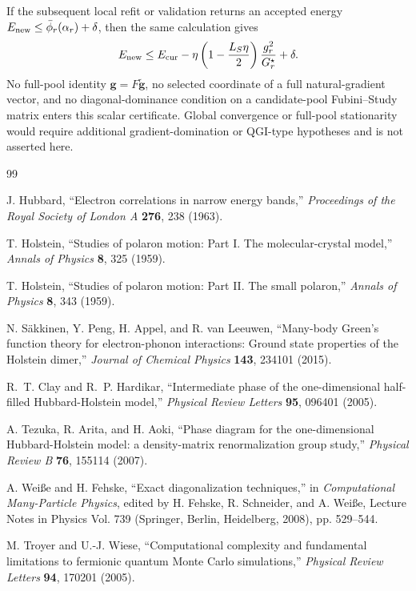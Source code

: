 \documentclass[
  reprint,
  amsmath,
  amssymb,
  aps,
  pra,
  nofootinbib,
  superscriptaddress,
  floatfix
]{revtex4-2}
\begin{document}
If the subsequent local refit or validation returns an accepted energy
\(E_{\rm new}\le\bar\phi_r(\alpha_r)+\delta\), then the same calculation
gives
\[
E_{\rm new}
\le
E_{\rm cur}
-
\eta\left(1-\frac{L_S\eta}{2}\right)
\frac{g_r^2}{G_r^\star}
+
\delta .
\]
No full-pool identity \(\mathbf g=F\tilde{\mathbf g}\), no selected
coordinate of a full natural-gradient vector, and no diagonal-dominance
condition on a candidate-pool Fubini--Study matrix enters this scalar
certificate. Global convergence or full-pool stationarity would require
additional gradient-domination or QGI-type hypotheses and is not asserted
here.

\begin{thebibliography}{99}

J. Hubbard,
``Electron correlations in narrow energy bands,''
\emph{Proceedings of the Royal Society of London A} \textbf{276}, 238 (1963).

T. Holstein,
``Studies of polaron motion: Part I. The molecular-crystal model,''
\emph{Annals of Physics} \textbf{8}, 325 (1959).

T. Holstein,
``Studies of polaron motion: Part II. The small polaron,''
\emph{Annals of Physics} \textbf{8}, 343 (1959).

N. S\"akkinen, Y. Peng, H. Appel, and R. van Leeuwen,
``Many-body Green's function theory for electron-phonon interactions: Ground state properties of the Holstein dimer,''
\emph{Journal of Chemical Physics} \textbf{143}, 234101 (2015).

R.~T. Clay and R.~P. Hardikar,
``Intermediate phase of the one-dimensional half-filled Hubbard-Holstein model,''
\emph{Physical Review Letters} \textbf{95}, 096401 (2005).

A. Tezuka, R. Arita, and H. Aoki,
``Phase diagram for the one-dimensional Hubbard-Holstein model: a density-matrix renormalization group study,''
\emph{Physical Review B} \textbf{76}, 155114 (2007).

A. Wei{\ss}e and H. Fehske,
``Exact diagonalization techniques,''
in \emph{Computational Many-Particle Physics},
edited by H. Fehske, R. Schneider, and A. Wei{\ss}e,
Lecture Notes in Physics Vol. 739 (Springer, Berlin, Heidelberg, 2008), pp. 529--544.

M. Troyer and U.-J. Wiese,
``Computational complexity and fundamental limitations to fermionic quantum Monte Carlo simulations,''
\emph{Physical Review Letters} \textbf{94}, 170201 (2005).


\end{thebibliography}
\end{document}
